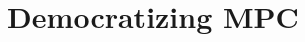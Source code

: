 \documentclass[conference,compsoc]{IEEEtran}
\begin{document}
\title{Democratizing MPC}





\maketitle
\IEEEpeerreviewmaketitle


\graphicspath{{./Images/}}












\newpage


\balance
\end{document}
